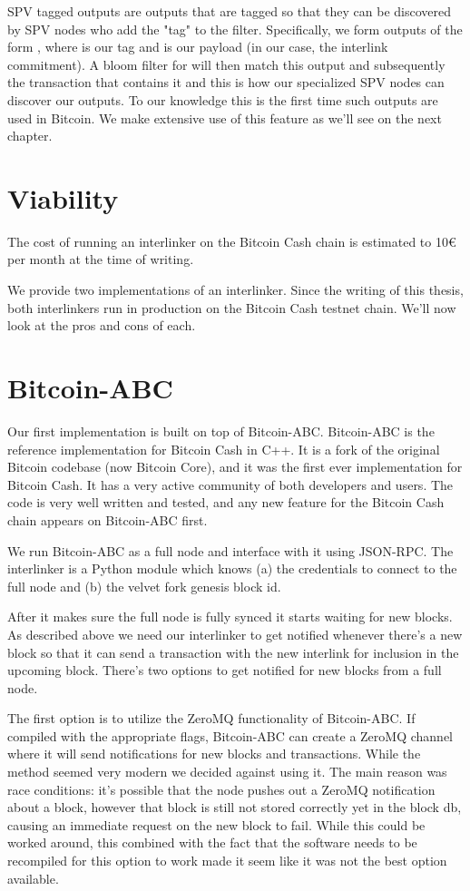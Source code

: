 SPV tagged outputs are outputs that are tagged so that they can be discovered by SPV nodes who add the "tag" to the filter. Specifically, we form outputs of the form , where  is our tag and  is our payload (in our case, the interlink commitment). A bloom filter for  will then match this output and subsequently the transaction that contains it and this is how our specialized SPV nodes can discover our outputs. To our knowledge this is the first time such outputs are used in Bitcoin. We make extensive use of this feature as we'll see on the next chapter.

\section{Viability}
The cost of running an interlinker on the Bitcoin Cash chain is estimated to 10€ per month at the time of writing.

We provide two implementations of an interlinker. Since the writing of this thesis, both interlinkers run in production on the Bitcoin Cash testnet chain. We'll now look at the pros and cons of each.

\section{Bitcoin-ABC}
Our first implementation is built on top of Bitcoin-ABC. Bitcoin-ABC is the reference implementation for Bitcoin Cash in C++. It is a fork of the original Bitcoin codebase (now Bitcoin Core), and it was the first ever implementation for Bitcoin Cash. It has a very active community of both developers and users. The code is very well written and tested, and any new feature for the Bitcoin Cash chain appears on Bitcoin-ABC first.

We run Bitcoin-ABC as a full node and interface with it using JSON-RPC. The interlinker is a Python module which knows (a) the credentials to connect to the full node and (b) the velvet fork genesis block id.

After it makes sure the full node is fully synced it starts waiting for new blocks. As described above we need our interlinker to get notified whenever there's a new block so that it can send a transaction with the new interlink for inclusion in the upcoming block. There's two options to get notified for new blocks from a full node.

The first option is to utilize the ZeroMQ functionality of Bitcoin-ABC. If compiled with the appropriate flags, Bitcoin-ABC can create a ZeroMQ channel where it will send notifications for new blocks and transactions. While the method seemed very modern we decided against using it. The main reason was race conditions: it's possible that the node pushes out a ZeroMQ notification about a block, however that block is still not stored correctly yet in the block db, causing an immediate  request on the new block to fail. While this could be worked around, this combined with the fact that the software needs to be recompiled for this option to work made it seem like it was not the best option available.

